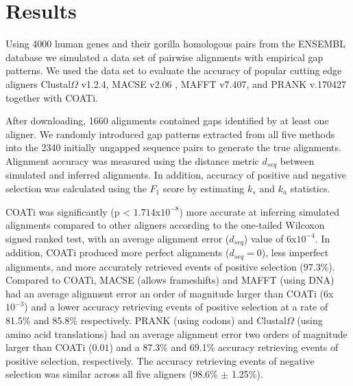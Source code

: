 \section{Results}

Using 4000 human genes and their gorilla homologous pairs from the ENSEMBL
database \parencite{ensembl_hubbard_2002} we simulated a data set of pairwise
alignments with empirical gap patterns.
We used the data set to evaluate the accuracy of popular cutting edge aligners
Clustal$\Omega$ v1.2.4, %
MACSE v2.06 \parencite{ranwez_macse_2011}, MAFFT v7.407, and
PRANK v.170427 %
together with COATi.

After downloading, 1660 alignments contained gaps identified by at least one
aligner.
We randomly introduced gap patterns extracted from all five methods into the
2340 initially ungapped sequence pairs to generate the true alignments.
Alignment accuracy was measured using the distance metric $d_{seq}$
\parencite{metrics_blackburne_whelan_2011} between simulated and inferred
alignments.
In addition, accuracy of positive and negative selection was calculated
using the $F_1$ score by estimating $k_s$ and $k_a$ statistics.


COATi was significantly (p < $1.714$x$10^{-8}$) more accurate at inferring
simulated alignments compared to other aligners according to the one-tailed
Wilcoxon signed ranked test, with an average alignment error ($d_{seq}$) value
of $6$x$10^{-4}$.
In addition, COATi produced more perfect alignments ($d_{seq}=0$), less imperfect
alignments, and more accurately retrieved events of positive selection (97.3\%).
Compared to COATi, MACSE (allows frameshifts) and MAFFT (using DNA) had an
average alignment error an order of magnitude larger than COATi ($6$x$10^{-3}$)
and a lower accuracy retrieving events of positive selection at a rate of 81.5\%
and 85.8\% respectively.
PRANK (using codons) and Clustal$\Omega$ (using amino acid translations) had
an average alignment error two orders of magnitude larger than COATi ($0.01$)
and a 87.3\% and 69.1\% accuracy retrieving events of positive selection,
respectively.
The accuracy retrieving events of negative selection was similar across all five
aligners (98.6\% $\pm$ 1.25\%).



